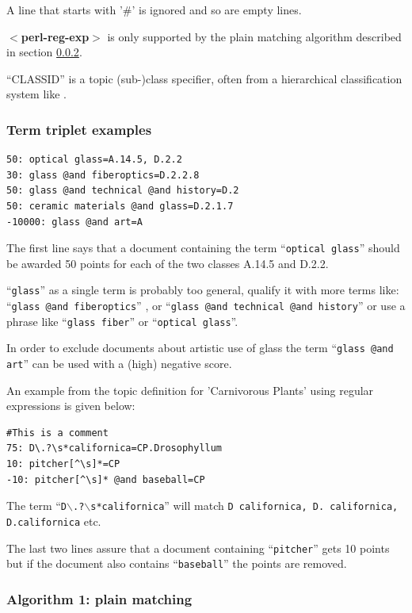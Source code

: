 A line that starts with '\#' is ignored and so are empty lines.

{\bf$<$perl-reg-exp$>$} is only supported by the plain
matching algorithm described in section \ref{std}.

``CLASSID'' is a topic (sub-)class specifier, often from a hierarchical
classification system like .

\subsubsection{Term triplet examples}

\begin{verbatim}
50: optical glass=A.14.5, D.2.2
30: glass @and fiberoptics=D.2.2.8
50: glass @and technical @and history=D.2
50: ceramic materials @and glass=D.2.1.7
-10000: glass @and art=A
\end{verbatim}

The first line says that a document containing the term ``{\tt optical
glass}'' should be awarded 50 points for each of the two classes A.14.5 and
D.2.2.

``{\tt glass}'' as a single term is probably too general, qualify it with more terms
  like: ``{\tt glass @and fiberoptics}'' , or ``{\tt glass @and technical @and history}''
  or  use a phrase like ``{\tt glass fiber}'' or ``{\tt optical glass}''.

  In order to exclude documents about artistic use of glass the term 
  ``{\tt glass @and art}'' can be used with a (high) negative score.

An example from the topic definition for 'Carnivorous Plants' using
  regular expressions is given below:
\begin{verbatim}
#This is a comment
75: D\.?\s*californica=CP.Drosophyllum
10: pitcher[^\s]*=CP
-10: pitcher[^\s]* @and baseball=CP
\end{verbatim}
The term ``{\tt D$\backslash$.?$\backslash$s*californica}''
 will match {\tt D californica, D. californica, D.californica} etc.

The last two lines assure that a document containing ``{\tt pitcher}'' gets
10 points but if the document also contains ``{\tt baseball}'' the points are removed.

\subsubsection{Algorithm 1: plain matching}
\label{std}

